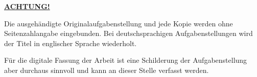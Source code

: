 \textbf{\underline{ACHTUNG!}}
\par
Die ausgehändigte Originalaufgabenstellung und jede Kopie
werden ohne Seitenzahlangabe
eingebunden. Bei deutschsprachigen Aufgabenstellungen wird
der Titel in englischer Sprache wiederholt.
\par
Für die digitale Fassung der Arbeit ist eine Schilderung der Aufgabenstellung aber durchaus sinnvoll und kann an dieser Stelle verfasst werden.
